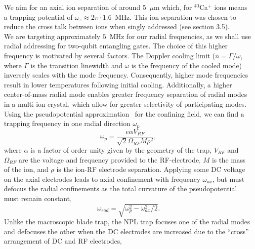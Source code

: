 \documentclass[12pt]{iopart}
\begin{document}

We aim for an axial ion separation of around $5$~$\mu$m which, for
$^{40}$Ca$^{+}$ ions means a trapping potential of $\omega_z \approx
2\pi \cdot 1.6$~MHz. This ion separation was chosen to reduce the
cross talk between ions when singly addressed (see section 3.5).\\ We
are targeting approximately $5$~MHz for our radial frequencies, as we
shall use radial addressing for two-qubit entangling gates. The choice
of this higher frequency is motivated by several factors. The Doppler
cooling limit ($\overline{n} = \Gamma/\omega$, where $\Gamma$ is the
transition linewidth and $\omega$ is the frequency of the cooled mode)
inversely scales with the mode frequency. Consequently, higher mode
frequencies result in lower temperatures following initial
cooling. Additionally, a higher center-of-mass radial mode enables
greater frequency separation of radial modes in a multi-ion crystal,
which allow for greater selectivity of participating modes. \\ Using
the pseudopotential approximation~\cite{madsen_planar_2004} for the confining field, we can find
a trapping frequency in one radial direction $\omega_p$
\begin{equation}
\omega_p = \frac{e\alpha V_{RF}}{\sqrt{2}\Omega_{RF}M\rho^2},
\end{equation}
where $\alpha$ is a factor of order unity given by the geometry of the
trap, $V_{RF}$ and $\Omega_{RF}$ are the voltage and frequency
provided to the RF-electrode, $M$ is the mass of the ion, and $\rho$
is the ion-RF electrode separation.  Applying some DC voltage on the
axial electrodes leads to axial confinement with frequency
$\omega_{ax}$, but must defocus the radial confinements as the total
curvature of the pseudopotential must remain constant,
\begin{equation}
\omega_{rad} = \sqrt{\omega_p^2 - \omega_{ax}^2/2}.
\end{equation}
Unlike the macroscopic blade trap, the NPL trap focuses one of
the radial modes and defocuses the other when the DC electrodes are
increased due to the ``cross'' arrangement of DC and RF electrodes,
\end{document}

